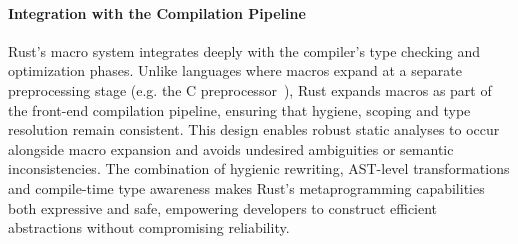\paragraph{Integration with the Compilation Pipeline}
Rust's macro system integrates deeply with the compiler's type checking and optimization phases.
Unlike languages where macros expand at a separate preprocessing stage (e.g. the C preprocessor~\cite{Dietrich2021CppSigET}), Rust expands macros as part of the front-end compilation pipeline, ensuring that hygiene, scoping and type resolution remain consistent.
This design enables robust static analyses to occur alongside macro expansion and avoids undesired ambiguities or semantic inconsistencies.
The combination of hygienic rewriting, AST-level transformations and compile-time type awareness makes Rust's metaprogramming capabilities both expressive and safe, empowering developers to construct efficient abstractions without compromising reliability.
